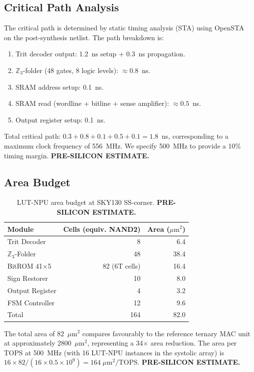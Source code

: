 \subsection{Critical Path Analysis}
\label{subsec:critical_path}

The critical path is determined by static timing analysis (STA) using
OpenSTA on the post-synthesis netlist.  The path breakdown is:

\begin{enumerate}
  \item Trit decoder output: 1.2~ns setup + 0.3~ns propagation.
  \item \(\mathbb{Z}_3\)-folder (48 gates, 8 logic levels): \(\approx 0.8\)~ns.
  \item SRAM address setup: 0.1~ns.
  \item SRAM read (wordline + bitline + sense amplifier): \(\approx 0.5\)~ns.
  \item Output register setup: 0.1~ns.
\end{enumerate}

Total critical path: \(0.3 + 0.8 + 0.1 + 0.5 + 0.1 = 1.8\)~ns,
corresponding to a maximum clock frequency of 556~MHz.  We specify
500~MHz to provide a 10\% timing margin.
\textbf{PRE-SILICON ESTIMATE.}

\subsection{Area Budget}
\label{subsec:area}

\begin{table}[ht]
\centering
\caption{LUT-NPU area budget at SKY130 SS-corner.
         \textbf{PRE-SILICON ESTIMATE.}}
\label{tab:area}
\begin{tabular}{lrr}
\hline
Module & Cells (equiv. NAND2) & Area (\(\mu\mathrm{m}^2\)) \\
\hline
Trit Decoder & 8 & 6.4 \\
\(\mathbb{Z}_3\)-Folder & 48 & 38.4 \\
BitROM 41$\times$5 & 82 (6T cells) & 16.4 \\
Sign Restorer & 10 & 8.0 \\
Output Register & 4 & 3.2 \\
FSM Controller & 12 & 9.6 \\
\hline
Total & 164 & 82.0 \\
\hline
\end{tabular}
\end{table}

The total area of 82~\(\mu\mathrm{m}^2\) compares favourably to the
reference ternary MAC unit at approximately 2800~\(\mu\mathrm{m}^2\),
representing a 34$\times$ area reduction.  The area per TOPS at 500~MHz
(with 16 LUT-NPU instances in the systolic array) is
\(16 \times 82 / (16 \times 0.5 \times 10^9) = 164\;\mu\mathrm{m}^2/\mathrm{TOPS}\).
\textbf{PRE-SILICON ESTIMATE.}

